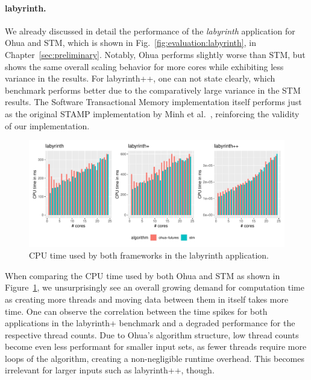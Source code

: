 \paragraph{labyrinth.} We already discussed in detail the performance of the \emph{labyrinth} application for Ohua and STM, which is shown in Fig.~\ref{fig:evaluation:labyrinth}, in Chapter~\ref{sec:preliminary}.
Notably, Ohua performs slightly worse than STM, but shows the same overall scaling behavior for more cores while exhibiting less variance in the results.
For labyrinth++, one can not state clearly, which benchmark performs better due to the comparatively large variance in the STM results.
The Software Transactional Memory implementation itself performs just as the original STAMP implementation by Minh et al.~\cite{minh2008stamp}, reinforcing the validity of our implementation.

\begin{figure}
    \centering
    \includegraphics[width=\textwidth,keepaspectratio]{gfx/results/cpu_labyrinth_comb}
    \caption{CPU time used by both frameworks in the labyrinth application.}%
    \label{fig:evaluation:labyrinth-cpu}
\end{figure}

When comparing the CPU time used by both Ohua and STM as shown in Figure~\ref{fig:evaluation:labyrinth-cpu}, we unsurprisingly see an overall growing demand for computation time as creating more threads and moving data between them in itself takes more time.
One can observe the correlation between the time spikes for both applications in the labyrinth+ benchmark and a degraded performance for the respective thread counts.
Due to Ohua's algorithm structure, low thread counts become even less performant for smaller input sets, as fewer threads require more loops of the algorithm, creating a non-negligible runtime overhead.
This becomes irrelevant for larger inputs such as labyrinth++, though.


